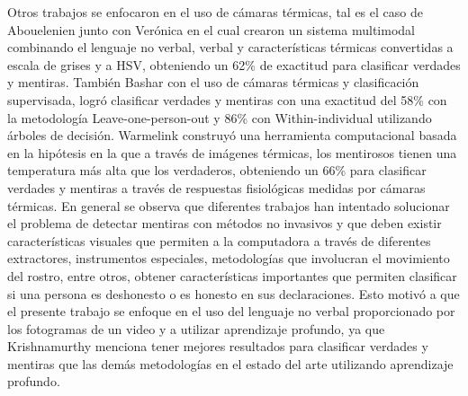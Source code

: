\begin{onehalfspacing}
Otros trabajos se enfocaron en el uso de cámaras térmicas, tal es el caso de Abouelenien junto con Verónica \cite{Abouelenien2016AnalyzingApproach} en el cual crearon un sistema multimodal combinando el lenguaje no verbal, verbal y características térmicas convertidas a escala de grises y a HSV, obteniendo un 62\% de exactitud para clasificar verdades y mentiras. También Bashar \cite{Rajoub2014ThermalDetection} con el uso de cámaras térmicas y clasificación supervisada, logró clasificar verdades y mentiras con una exactitud del 58\% con la metodología Leave-one-person-out y 86\% con Within-individual utilizando árboles de decisión. Warmelink \cite{Warmelink2011ThermalAirports} construyó una herramienta computacional basada en la hipótesis en la que a través de imágenes térmicas, los mentirosos tienen una temperatura más alta que los verdaderos, obteniendo un 66\% para clasificar verdades y mentiras a través de respuestas fisiológicas medidas por cámaras térmicas.
En general se observa que diferentes trabajos han intentado solucionar el problema de detectar mentiras con métodos no invasivos y que deben existir características visuales que permiten a la computadora a través de diferentes extractores, instrumentos especiales, metodologías que involucran el movimiento del rostro, entre otros, obtener características importantes que permiten clasificar si una persona es deshonesto o es honesto en sus declaraciones. Esto motivó a que el presente trabajo se enfoque en el uso del lenguaje no verbal proporcionado por los fotogramas de un video y a utilizar aprendizaje profundo, ya que Krishnamurthy menciona tener mejores resultados para clasificar verdades y mentiras que las demás metodologías en el estado del arte utilizando aprendizaje profundo.

\end{onehalfspacing}
